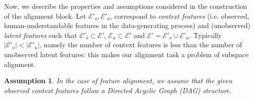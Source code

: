 \documentclass{article}
\newcommand{\ftcom}[2][]{\todo[author=FT, #1]{#2}}
\newtheorem{asu}{Assumption}
\begin{document}
Now, we describe the properties and assumptions considered in the construction of the alignment block.
Let $\mathcal{E}'_o, \mathcal{E'}_u$, correspond to \emph{context features} (i.e. observed, human-understandable features in the data-generating process)  and (unobserved) \emph{latent features} such that $\mathcal{E}'_o \subset \mathcal{E}'$, $\mathcal{E}_u \subset \mathcal{E}'$ and $\mathcal{E}'  = \mathcal{E}'_o \cup \mathcal{E}'_u$.
Typically $|\mathcal{E}'_o| < |\mathcal{E}'_u|$, namely the number of context features is less than the number of unobserved latent features: this makes our alignment task a problem of subspace alignment.






\begin{asu}
\label{assumption:depth_independence}
In the case of feature alignment, we assume that the given observed \emph{context features} follow a Directed Acyclic Graph (DAG) structure.
\end{asu}
\end{document}
